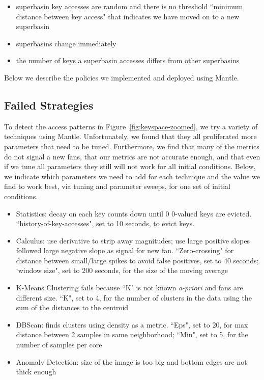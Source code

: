 \begin{itemize}

  \item superbasin key accesses are random and there is no threshold ``minimum distance
  between key access" that indicates we have moved on to a new superbasin

  \item superbasins change immediately

  \item the number of keys a superbasin accesses differs from other superbasins

\end{itemize}

Below we describe the policies we implemented and deployed using Mantle.

\subsection{Failed Strategies}

To detect the access patterns in Figure~\ref{fig:keyspace-zoomed}, we try a
variety of techniques using Mantle. Unfortunately, we found that they all
proliferated more parameters that need to be tuned. Furthermore, we find that
many of the metrics do not signal a new fans, that our metrics are not accurate
enough, and that even if we tune all parameters they still will not work for
all initial conditions.  Below, we indicate which parameters we need to add for
each technique and the value we find to work best, via tuning and parameter
sweeps, for one set of initial conditions.

\begin{itemize}

  \item Statistics: decay on each key counts down until 0 0-valued keys are
evicted.  ``history-of-key-accesses", set to 10 seconds, to evict keys.

  \item Calculus: use derivative to strip away magnitudes; use large positive
slopes followed large negative slope as signal for new fan. ``Zero-crossing"
for distance between small/large spikes to avoid false positives, set to 40
seconds; `window size", set to 200 seconds, for the size of the moving average 

  \item K-Means Clustering fails because ``K" is not known {\it a-priori} and
fans are different size. ``K", set to 4, for the number of clusters in the data
using the sum of the distances to the centroid

  \item DBScan: finds clusters using density as a metric. ``Eps", set to 20, for
max distance between 2 samples in same neighborhood; ``Min", set to 5, for the
number of samples per core

  \item Anomaly Detection: size of the image is too big and bottom edges are
not thick enough

\end{itemize}

